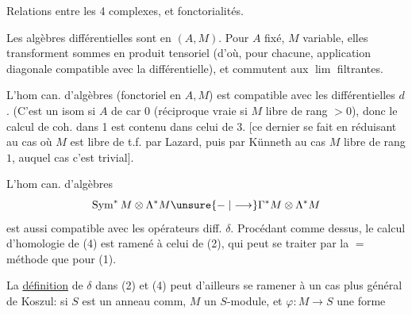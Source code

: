 Relations entre les 4 complexes, et fonctorialités.

Les  algèbres différentielles sont  en $(A,M)$. Pour $A$ fixé, $M$ variable, elles transforment sommes en produit tensoriel (d'où, pour chacune, application diagonale compatible avec  la différentielle), et commutent aux \uline{$\lim$} filtrantes.

L'hom can. d'algèbres (fonctoriel en $A,M$)
est compatible avec les différentielles $d$. (C'est un isom  si $A$ de car $0$ (réciproque vraie si  $M$ libre de rang $>0$), donc le calcul de coh. dans 1 est contenu dans celui de 3. [ce dernier se fait en réduisant au cas où $M$ est libre de t.f. par Lazard, puis par Künneth au cas $M$ libre de rang $1$, auquel cas c'est trivial].

L'hom can. d'algèbres
\[
 \operatorname{Sym}^*M\otimes\Lambda^*M\unsure{\relbar|\longrightarrow}\Gamma^*M\otimes\Lambda^*M
\]
est aussi compatible avec les opérateurs diff. $\delta$.   Procédant comme dessus, le calcul d'homologie de (4) est ramené à celui de (2), qui peut se traiter par la $=$ méthode que pour (1).

La \uline{définition} de  $\delta$ dans (2) et (4) peut d'ailleurs se ramener à un cas plus général de Koszul: si $S$ est un anneau comm, $M$ un $S$-module,  et $\varphi\colon M\to S$ une forme


